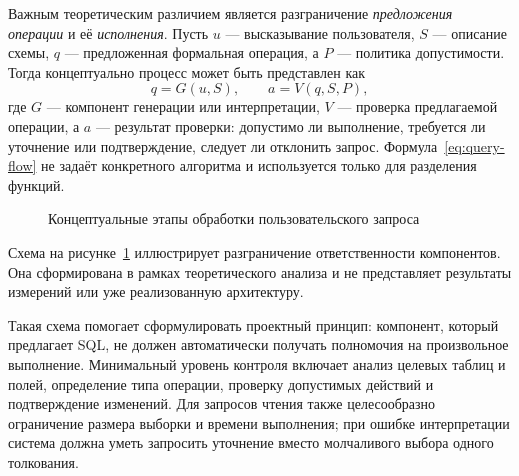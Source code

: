 Важным теоретическим различием является разграничение \emph{предложения операции} и её \emph{исполнения}. Пусть $u$ — высказывание пользователя, $S$ — описание схемы, $q$ — предложенная формальная операция, а $P$ — политика допустимости. Тогда концептуально процесс может быть представлен как
\begin{equation}
 q = G(u,S), \qquad a = V(q,S,P),
 \label{eq:query-flow}
\end{equation}
где $G$ — компонент генерации или интерпретации, $V$ — проверка предлагаемой операции, а $a$ — результат проверки: допустимо ли выполнение, требуется ли уточнение или подтверждение, следует ли отклонить запрос. Формула~\eqref{eq:query-flow} не задаёт конкретного алгоритма и используется только для разделения функций.

\begin{figure}[htbp]
\centering
{}
\caption{Концептуальные этапы обработки пользовательского запроса}
\label{fig:intent-process}
\end{figure}

Схема на рисунке~\ref{fig:intent-process} иллюстрирует разграничение ответственности компонентов. Она сформирована в рамках теоретического анализа и не представляет результаты измерений или уже реализованную архитектуру.

Такая схема помогает сформулировать проектный принцип: компонент, который предлагает SQL, не должен автоматически получать полномочия на произвольное выполнение. Минимальный уровень контроля включает анализ целевых таблиц и полей, определение типа операции, проверку допустимых действий и подтверждение изменений. Для запросов чтения также целесообразно ограничение размера выборки и времени выполнения; при ошибке интерпретации система должна уметь запросить уточнение вместо молчаливого выбора одного толкования.

